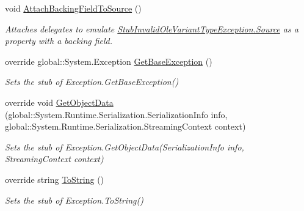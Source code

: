 \begin{DoxyCompactItemize}
void \hyperlink{class_system_1_1_runtime_1_1_interop_services_1_1_fakes_1_1_stub_invalid_ole_variant_type_exception_a4967c98129d1304d360557ffadf2f025}{Attach\-Backing\-Field\-To\-Source} ()
\begin{DoxyCompactList}\small\item\em Attaches delegates to emulate \hyperlink{class_system_1_1_runtime_1_1_interop_services_1_1_fakes_1_1_stub_invalid_ole_variant_type_exception_a141c0cdabd3e04c0157f65db3cf1c6d7}{Stub\-Invalid\-Ole\-Variant\-Type\-Exception.\-Source} as a property with a backing field.\end{DoxyCompactList}\item 
override global\-::\-System.\-Exception \hyperlink{class_system_1_1_runtime_1_1_interop_services_1_1_fakes_1_1_stub_invalid_ole_variant_type_exception_ad4801cbc9f7fe3cdf0b87bc0c2701795}{Get\-Base\-Exception} ()
\begin{DoxyCompactList}\small\item\em Sets the stub of Exception.\-Get\-Base\-Exception()\end{DoxyCompactList}\item 
override void \hyperlink{class_system_1_1_runtime_1_1_interop_services_1_1_fakes_1_1_stub_invalid_ole_variant_type_exception_a6154e5e8c3cdfb5a7d857672897d7fb9}{Get\-Object\-Data} (global\-::\-System.\-Runtime.\-Serialization.\-Serialization\-Info info, global\-::\-System.\-Runtime.\-Serialization.\-Streaming\-Context context)
\begin{DoxyCompactList}\small\item\em Sets the stub of Exception.\-Get\-Object\-Data(\-Serialization\-Info info, Streaming\-Context context)\end{DoxyCompactList}\item 
override string \hyperlink{class_system_1_1_runtime_1_1_interop_services_1_1_fakes_1_1_stub_invalid_ole_variant_type_exception_a83c2e6203ecce4a3227c0771903e18ba}{To\-String} ()
\begin{DoxyCompactList}\small\item\em Sets the stub of Exception.\-To\-String()\end{DoxyCompactList}\end{DoxyCompactItemize}
